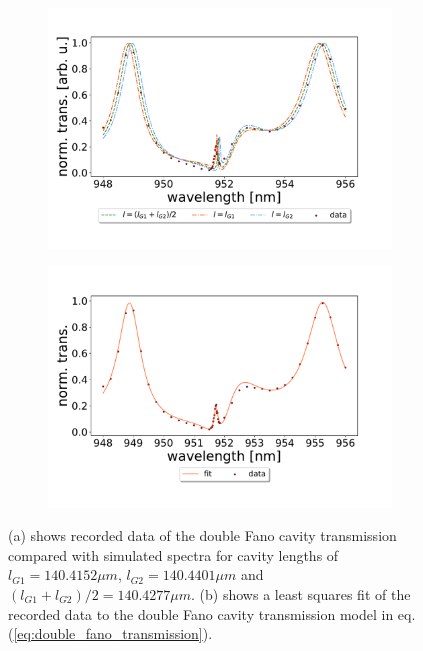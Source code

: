 \begin{figure}[h!]
    \centering
    \begin{subfigure}[b]{0.49\textwidth}
        \centering
        \includegraphics[width=\textwidth]{figures/results/129um_long_scan_sim_comparison.pdf}
        \caption{}
        \label{fig:129um_long_scan_sim_comparison}
    \end{subfigure}
    \begin{subfigure}[b]{0.49\textwidth}
        \centering
        \includegraphics[width=\textwidth]{figures/results/129um_long_scan_fit2.pdf}
        \caption{}
        \label{fig:129um_long_scan_fit}
    \end{subfigure}
    \caption{(a) shows recorded data of the double Fano cavity transmission compared with simulated spectra for cavity lengths of $l_{G1} = 140.4152 \mu m$, $l_{G2} = 140.4401 \mu m$ and $(l_{G1} + l_{G2})/2 = 140.4277 \mu m$. (b) shows a least squares fit of the recorded data to the double Fano cavity transmission model in eq. (\ref{eq:double_fano_transmission}).}
    \label{fig:129um_cavity_fit_and_sim}
\end{figure}

